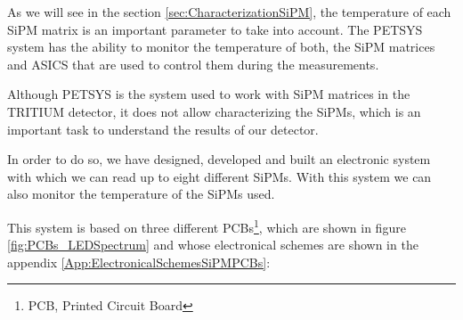 As we will see in the section \ref{sec:CharacterizationSiPM}, the temperature of each SiPM matrix is an important parameter to take into account. The PETSYS system has the ability to monitor the temperature of both, the SiPM matrices and ASICS that are used to control them during the measurements.

Although PETSYS is the system used to work with SiPM matrices in the TRITIUM detector, it does not allow characterizing the SiPMs, which is an important task to understand the results of our detector.

In order to do so, we have designed, developed and built an electronic system with which we can read up to eight different SiPMs. With this system we can also monitor the temperature of the SiPMs used.

This system is based on three different PCBs\footnote{PCB, Printed Circuit Board}, which are shown in figure \ref{fig:PCBs_LEDSpectrum} and whose electronical schemes are shown in the appendix \ref{App:ElectronicalSchemesSiPMPCBs}:

